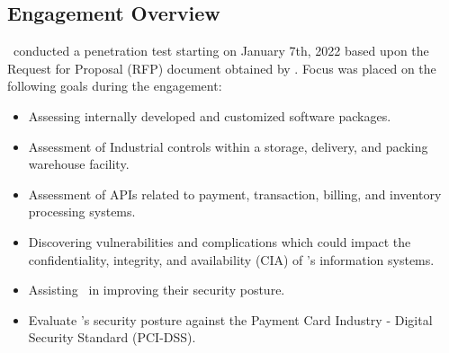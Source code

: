 \newpage
\subsection{Engagement Overview}
    \teamname\ conducted a penetration test starting on January 7th, 2022 based upon the Request for Proposal (RFP) document obtained by \teamname. Focus was placed on the following goals during the engagement:
    
    \begin{itemize}
        \item Assessing internally developed and customized software packages.
        \item Assessment of Industrial controls within a storage, delivery, and packing warehouse facility.
        \item Assessment of APIs related to payment, transaction, billing, and inventory processing systems.
        \item Discovering vulnerabilities and complications which could impact the confidentiality, integrity, and availability (CIA) of \cptc's information systems.
        \item Assisting \cptc\ in improving their security posture.
        
        \item Evaluate \cptc's security posture against the Payment Card Industry - Digital Security Standard (PCI-DSS).
    \end{itemize}
